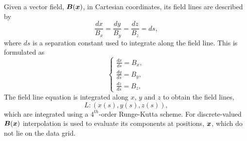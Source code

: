 \documentclass[useAMS,usenatbib]{mn2e}
\begin{document}
Given a vector field, $\boldsymbol{B}(\boldsymbol{x})$, in Cartesian coordinates, its field lines are described by
\begin{equation}
\frac{dx}{B_{x}}=\frac{dy}{B_{y}}=\frac{dz}{B_{z}}=ds,
\label{f_lines_eqn}
\end{equation}
where $ds$ is a separation constant used to integrate along the field line. This is formulated as
\begin{equation}
\begin{cases}
\frac{dx}{ds}=B_x,\\
\frac{dy}{ds}=B_y,\\
\frac{dz}{ds}=B_z,
\end{cases}
\label{fld_eqns}
\end{equation}
 The field line equation is integrated along $x$, $y$ and $z$ to obtain the field lines,
\[L: (x(s),y(s),z(s)),\]
which are integrated using a $4^{th}$-order Runge-Kutta scheme. For discrete-valued $\boldsymbol{B}(\boldsymbol{x})$ interpolation is used to evaluate its components at positions, $\boldsymbol{x}$, which do not lie on the data grid.
\end{document}
